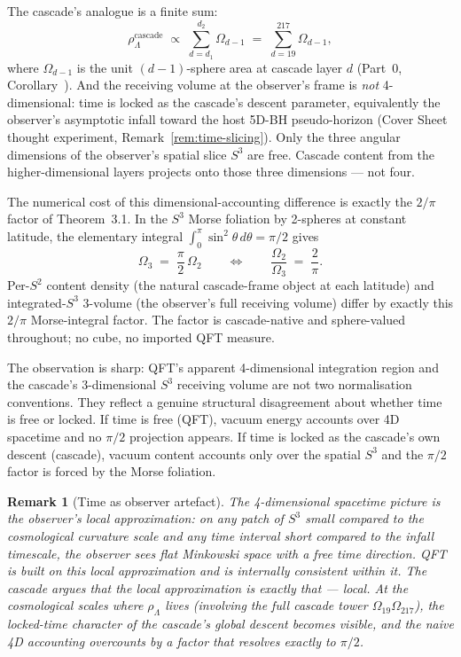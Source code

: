 \documentclass[11pt,a4paper]{article}
\newtheorem{remark}[theorem]{Remark}
\begin{document}
The cascade's analogue is a finite sum:
\begin{equation}\label{eq:cascade-vacuum}
\rho_\Lambda^{\mathrm{cascade}} \;\propto\; \sum_{d=d_1}^{d_2}\Omega_{d-1}
\;=\; \sum_{d=19}^{217}\Omega_{d-1},
\end{equation}
where $\Omega_{d-1}$ is the unit $(d{-}1)$-sphere area at cascade layer
$d$ (Part~0, Corollary~). And the receiving volume at the observer's
frame is \emph{not} 4-dimensional: time is locked as the cascade's
descent parameter, equivalently the observer's asymptotic infall
toward the host 5D-BH pseudo-horizon (Cover Sheet thought experiment,
Remark~\ref{rem:time-slicing}). Only the three angular dimensions
of the observer's spatial slice $S^3$ are free. Cascade content from
the higher-dimensional layers projects onto those three dimensions ---
not four.

The numerical cost of this dimensional-accounting difference is
exactly the $2/\pi$ factor of Theorem~3.1. In the $S^3$ Morse foliation
by 2-spheres at constant latitude, the elementary integral
$\int_0^\pi\sin^2\theta\,d\theta = \pi/2$ gives
\[
\Omega_3 \;=\; \frac{\pi}{2}\,\Omega_2 \qquad\Longleftrightarrow\qquad \frac{\Omega_2}{\Omega_3} \;=\; \frac{2}{\pi}.
\]
Per-$S^2$ content density (the natural cascade-frame object at each
latitude) and integrated-$S^3$ 3-volume (the observer's full receiving
volume) differ by exactly this $2/\pi$ Morse-integral factor. The
factor is cascade-native and sphere-valued throughout; no cube, no
imported QFT measure.

The observation is sharp: QFT's apparent 4-dimensional integration
region and the cascade's 3-dimensional $S^3$ receiving volume are not
two normalisation conventions. They reflect a genuine structural
disagreement about whether time is free or locked. If time is free
(QFT), vacuum energy accounts over 4D spacetime and no $\pi/2$
projection appears. If time is locked as the cascade's own descent
(cascade), vacuum content accounts only over the spatial $S^3$ and the
$\pi/2$ factor is forced by the Morse foliation.

\begin{remark}[Time as observer artefact]
The 4-dimensional spacetime picture is the observer's local
approximation: on any patch of $S^3$ small compared to the cosmological
curvature scale and any time interval short compared to the infall
timescale, the observer sees flat Minkowski space with a free time
direction. QFT is built on this local approximation and is internally
consistent within it. The cascade argues that the local approximation
is exactly that --- local. At the cosmological scales where
$\rho_\Lambda$ lives (involving the full cascade tower
$\Omega_{19}\Omega_{217}$), the locked-time character of the cascade's
global descent becomes visible, and the naive 4D accounting overcounts
by a factor that resolves exactly to $\pi/2$.
\end{remark}
\end{document}
